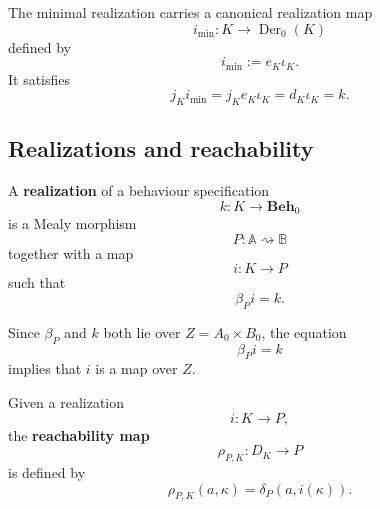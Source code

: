 The minimal realization carries a canonical realization map
\[
    i_{\min}:K\to\operatorname{Der}_0(K)
\]
defined by
\[
    i_{\min}:=e_K\iota_K.
\]
It satisfies
\[
    j_K i_{\min}
    =
    j_Ke_K\iota_K
    =
    d_K\iota_K
    =
    k.
\]

\subsection{Realizations and reachability}
\label{subsec:realizations-reachability}

\begin{definition}[Realization]
\label{def:realization}
    A \textbf{realization} of a behaviour specification
    \[
        k:K\to\mathbf{Beh}_0
    \]
    is a Mealy morphism
    \[
        P:\mathbb A\rightsquigarrow\mathbb B
    \]
    together with a map
    \[
        i:K\to P
    \]
    such that
    \[
        \beta_P i=k.
    \]
\end{definition}

\begin{remark}
\label{rem:realization-over-base}
    Since \(\beta_P\) and \(k\) both lie over \(Z=A_0\times B_0\), the equation
    \[
        \beta_P i=k
    \]
    implies that \(i\) is a map over \(Z\).
\end{remark}

\begin{definition}
\label{def:reachability-map}
    Given a realization
    \[
        i:K\to P,
    \]
    the \textbf{reachability map}
    \[
        \rho_{P,K}:D_K\to P
    \]
    is defined by
    \[
        \rho_{P,K}(a,\kappa)
        =
        \delta_P(a,i(\kappa)).
    \]
\end{definition}

